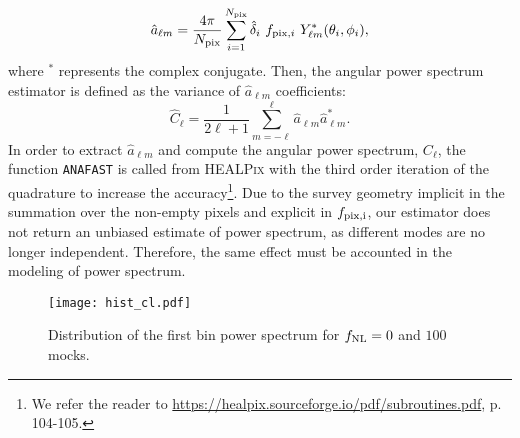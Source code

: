 \begin{equation}
        \hat{a}_{\ell m} = \frac{4\pi}{N_{{\rm pix}}} \sum_{i=1}^{N_{{\rm pix}}}  \hat{\delta}_{i}~f_{{\rm pix}, i}~ Y^{*}_{\ell m}(\theta_{i}, \phi_{i}),
\end{equation}
where $^{*}$ represents the complex conjugate. Then, the angular power spectrum estimator is defined as the variance of  $\hat{a}_{\ell m}$  coefficients:
\begin{equation}\label{eq:pusedocell}
        \hat{C}_{\ell} = \frac{1}{2\ell +1} \sum_{m=-\ell}^{\ell} \hat{a}_{\ell m} \hat{a}^{*}_{\ell m}.
\end{equation}
In order to extract $\hat{a}_{\ell m}$  and compute the angular power spectrum, $C_{\ell}$, the function \texttt{ANAFAST} is called from \textsc{HEALPix} \citep{gorski2005healpix} with the third order iteration of the quadrature to increase the accuracy\footnote{We refer the reader to \url{https://healpix.sourceforge.io/pdf/subroutines.pdf}, p. 104-105.}. Due to the survey geometry implicit in the summation over the non-empty pixels and explicit in $f_{\rm pix, i}$, our estimator does not return an unbiased estimate of power spectrum, as different modes are no longer independent. Therefore, the same effect must be accounted in the modeling of power spectrum.

\begin{figure}
\centering
\texttt{[image: hist\_cl.pdf]}
\caption{Distribution of the first bin power spectrum for $f_{\rm NL}=0$ and $100$ mocks.}\label{fig:histcell}
\end{figure}

